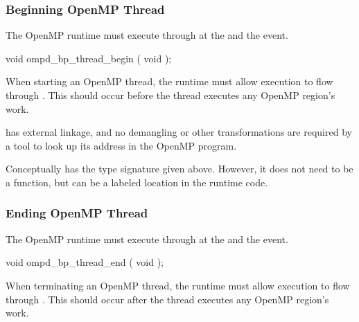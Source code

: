 \subsubsection{Beginning OpenMP Thread}
\label{subsubsec:ompd_bp_thread_begin}

\summary
The OpenMP runtime must execute through
 at the  and the  event.


\begin{cspecific}
\begin{ompSyntax}
void ompd_bp_thread_begin ( void );
\end{ompSyntax}
\end{cspecific}


\descr

When starting an OpenMP thread, the runtime must allow execution
to flow through .
This should occur before the thread executes any OpenMP region's work.

\restrictions

 has external  linkage, and no
demangling or other transformations are required by a tool
to look up its address in the OpenMP program.

Conceptually  has the type signature
given above.
However, it does not need to be a function, but can be a labeled location
in the runtime code.

\subsubsection{Ending OpenMP Thread}
\label{subsubsec:ompd_bp_thread_begin}

\summary
The OpenMP runtime must execute through
 at the  and the  event.


\begin{cspecific}
\begin{ompSyntax}
void ompd_bp_thread_end ( void );
\end{ompSyntax}
\end{cspecific}


\descr

When terminating an OpenMP thread, the runtime must allow execution
to flow through .
This should occur after the thread executes any OpenMP region's work.

